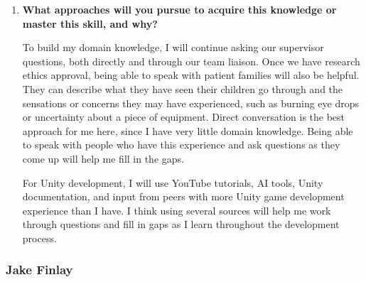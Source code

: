 \documentclass[12pt]{article}
\begin{document}
\begin{enumerate}
    \item \textbf{What approaches will you pursue to acquire this
    knowledge or master this skill, and why?}

    To build my domain knowledge, I will continue asking our supervisor
    questions, both directly and through our team liaison. Once we have
    research ethics approval, being able to speak with patient families
    will also be helpful. They can describe what they have seen their
    children go through and the sensations or concerns they may have
    experienced, such as burning eye drops or uncertainty about a piece
    of equipment. Direct conversation is the best approach for me here,
    since I have very little domain knowledge. Being able to speak with
    people who have this experience and ask questions as they come up
    will help me fill in the gaps.

    For Unity development, I will use YouTube tutorials, AI tools, Unity
    documentation, and input from peers with more Unity game development
    experience than I have. I think using several sources will help me
    work through questions and fill in gaps as I learn throughout the
    development process.

\end{enumerate}

\subsubsection*{Jake Finlay}
\end{document}
